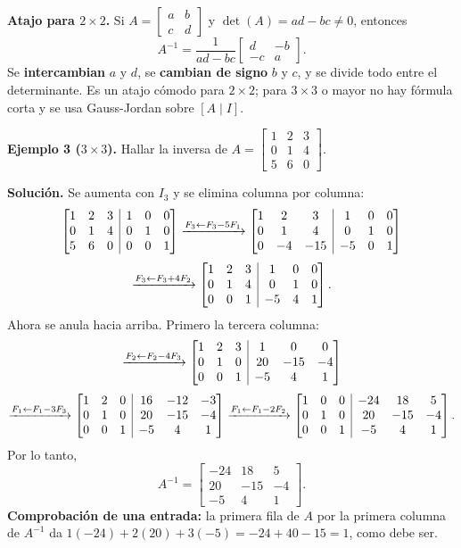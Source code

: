 \documentclass[12pt, letterpaper]{article}
\makeatletter
\newcommand{\mwmat}[1]{\ensuremath{\begin{bmatrix}#1\end{bmatrix}}}
\newcommand{\mwaug}[2]{\ensuremath{\left[\begin{array}{@{}#1@{}}#2\end{array}\right]}}
\makeatother
\begin{document}
\begin{cuadroteoria}
  \small
  \textbf{Atajo para $2\times2$.} Si $A=\mwmat{a&b\\c&d}$ y
  $\det(A)=ad-bc\neq0$, entonces
  \[
    A^{-1}=\frac{1}{ad-bc}\mwmat{d&-b\\-c&a}.
  \]
  Se \textbf{intercambian} $a$ y $d$, se \textbf{cambian de signo} $b$ y $c$, y
  se divide todo entre el determinante. Es un atajo cómodo para $2\times2$;
  para $3\times3$ o mayor no hay fórmula corta y se usa
  Gauss-Jordan sobre $[A\mid I]$.
\end{cuadroteoria}

\begin{cuadrosolucion}
  \small
  \textbf{Ejemplo 3 ($3\times3$).} Hallar la inversa de
  $A=\mwmat{1&2&3\\0&1&4\\5&6&0}$.

  \medskip
  \textbf{Solución.} Se aumenta con $I_3$ y se elimina columna por columna:
  \[
    \mwaug{ccc|ccc}{1&2&3&1&0&0\\
                    0&1&4&0&1&0\\
                    5&6&0&0&0&1}
    \xrightarrow{F_3\leftarrow F_3-5F_1}
    \mwaug{ccc|ccc}{1&2&3&1&0&0\\
                    0&1&4&0&1&0\\
                    0&-4&-15&-5&0&1}
  \]
  \[
    \xrightarrow{F_3\leftarrow F_3+4F_2}
    \mwaug{ccc|ccc}{1&2&3&1&0&0\\
                    0&1&4&0&1&0\\
                    0&0&1&-5&4&1}.
  \]
  Ahora se anula hacia arriba. Primero la tercera columna:
  \[
    \xrightarrow{F_2\leftarrow F_2-4F_3}
    \mwaug{ccc|ccc}{1&2&3&1&0&0\\
                    0&1&0&20&-15&-4\\
                    0&0&1&-5&4&1}
  \]
  \[
    \xrightarrow{F_1\leftarrow F_1-3F_3}
    \mwaug{ccc|ccc}{1&2&0&16&-12&-3\\
                    0&1&0&20&-15&-4\\
                    0&0&1&-5&4&1}
    \xrightarrow{F_1\leftarrow F_1-2F_2}
    \mwaug{ccc|ccc}{1&0&0&-24&18&5\\
                    0&1&0&20&-15&-4\\
                    0&0&1&-5&4&1}.
  \]
  Por lo tanto,
  \[
    A^{-1}=\mwmat{-24&18&5\\20&-15&-4\\-5&4&1}.
  \]
  \textbf{Comprobación de una entrada:} la primera fila de $A$ por la primera
  columna de $A^{-1}$ da $1(-24)+2(20)+3(-5)=-24+40-15=1$, como debe ser.
  \checkmark
\end{cuadrosolucion}
\end{document}
